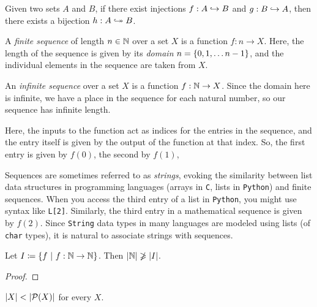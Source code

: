 \begin{theorem}
    Given two sets $A$ and $B$,
    if there exist injections $f: A \hookrightarrow B$ and $g: B \hookrightarrow A$,
    then there exists a bijection $h: A \bijection B$.
\end{theorem}

\begin{definition}[Sequences]
    A \emph{finite sequence} of length $n \in \mathbb{N}$ over a set $X$ is a function $f: n \to X$.
    Here, the length of the sequence is given by its \emph{domain} $n = \set*{0, 1, \dots n - 1}$,
    and the individual elements in the sequence are taken from $X$.

    An \emph{infinite sequence} over a set $X$ is a function $f: \mathbb{N} \to X$.
    Since the domain here is infinite, we have a place in the sequence for each natural number,
    so our sequence has infinite length.

    Here, the inputs to the function act as indices for the entries in the sequence,
    and the entry itself is given by the output of the function at that index.
    So, the first entry is given by $f(0)$, the second by $f(1)$, \etc

    Sequences are sometimes referred to as \emph{strings},
    evoking the similarity between list data structures in programming languages
    (\eg arrays in \texttt{C}, lists in \texttt{Python})
    and finite sequences.
    When you access the third entry of a list in \texttt{Python},
    you might use syntax like \texttt{L[2]}.
    Similarly, the third entry in a mathematical sequence is given by $f(2)$.
    Since \texttt{String} data types in many languages are modeled using lists (\eg of \texttt{char} types),
    it is natural to associate strings with sequences.
\end{definition}

\begin{theorem}
    Let $I \defn \set*{f \suchthat f: \N \to \N}$.
    Then $\lvert\mathbb{N}\rvert \not \geqslant \lvert I\rvert$.
\end{theorem}
\begin{proof}
\end{proof}

\begin{theorem}
    $\cardinality{X} < \cardinality{\power{X}}$ for every $X$.
\end{theorem}


